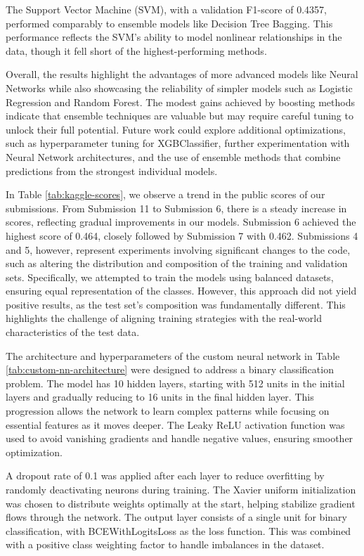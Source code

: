 \documentclass{article} %
\begin{document}
The Support Vector Machine (SVM), with a validation F1-score of 0.4357, performed comparably to ensemble models like Decision Tree Bagging. This performance reflects the SVM's ability to model nonlinear relationships in the data, though it fell short of the highest-performing methods.

Overall, the results highlight the advantages of more advanced models like Neural Networks while also showcasing the reliability of simpler models such as Logistic Regression and Random Forest. The modest gains achieved by boosting methods indicate that ensemble techniques are valuable but may require careful tuning to unlock their full potential. Future work could explore additional optimizations, such as hyperparameter tuning for XGBClassifier, further experimentation with Neural Network architectures, and the use of ensemble methods that combine predictions from the strongest individual models. 


In Table \ref{tab:kaggle-scores}, we observe a trend in the public scores of our submissions. From Submission 11 to Submission 6, there is a steady increase in scores, reflecting gradual improvements in our models. Submission 6 achieved the highest score of 0.464, closely followed by Submission 7 with 0.462. Submissions 4 and 5, however, represent experiments involving significant changes to the code, such as altering the distribution and composition of the training and validation sets. Specifically, we attempted to train the models using balanced datasets, ensuring equal representation of the classes. However, this approach did not yield positive results, as the test set's composition was fundamentally different. This highlights the challenge of aligning training strategies with the real-world characteristics of the test data.

The architecture and hyperparameters of the custom neural network in Table \ref{tab:custom-nn-architecture} were designed to address a binary classification problem. The model has 10 hidden layers, starting with 512 units in the initial layers and gradually reducing to 16 units in the final hidden layer. This progression allows the network to learn complex patterns while focusing on essential features as it moves deeper. The Leaky ReLU activation function was used to avoid vanishing gradients and handle negative values, ensuring smoother optimization.

A dropout rate of 0.1 was applied after each layer to reduce overfitting by randomly deactivating neurons during training. The Xavier uniform initialization was chosen to distribute weights optimally at the start, helping stabilize gradient flows through the network. The output layer consists of a single unit for binary classification, with BCEWithLogitsLoss as the loss function. This was combined with a positive class weighting factor to handle imbalances in the dataset.
\end{document}
